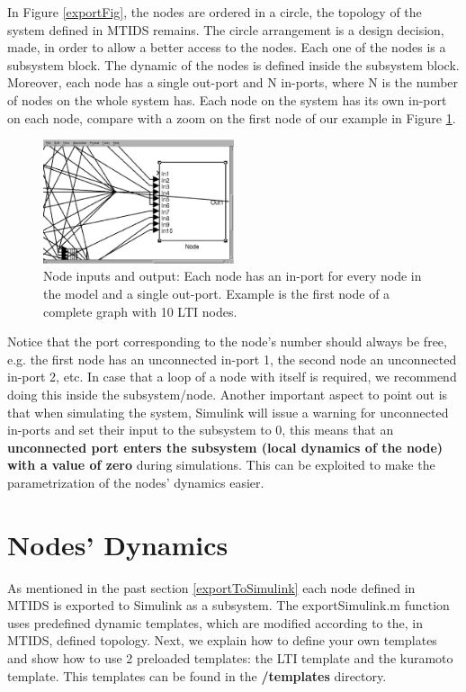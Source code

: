 \documentclass[a4paper,twoside, openright,12pt]{report}
\begin{document}
In Figure \ref{exportFig}, the nodes are ordered in a circle, the topology of the system defined in MTIDS remains. The circle arrangement is a 
design decision, made, in order to allow a better access to the nodes. Each one of the nodes is a subsystem block. The dynamic of the nodes is defined inside
the subsystem block. Moreover, each node has a single out-port and N in-ports, where N is the number of nodes on the whole system has. Each node on the 
system has its own in-port on each node, compare with a zoom on the first node of our example in Figure \ref{nodeFig}. \\
 
\begin{figure}[htb]
\centering
\includegraphics[width=0.5\textwidth]{pics/screenNode.eps}
\caption[MTIDS node in Simulink]{Node inputs and output: Each node has an in-port for every node in the model and a single out-port. Example is the first node of a complete graph with 10 LTI nodes. }
\label{nodeFig}
\end{figure}
Notice that the port corresponding to the node's number
should always be free, e.g. the first node has an unconnected in-port 1, the second node an unconnected in-port 2, etc. 
In case that a loop of a node with itself is required, we recommend doing this inside the subsystem/node. 
Another important aspect to point out is that when simulating the system, Simulink will issue a warning for unconnected in-ports and set their input to the subsystem to 0, this means 
that an \textbf{unconnected port enters the subsystem (local dynamics of the node) with a value of zero} during simulations. This can be exploited to 
make the parametrization of the nodes' dynamics easier. 

\section{Nodes' Dynamics}

As mentioned in the past section \ref{exportToSimulink} each node defined in MTIDS is exported to Simulink as a subsystem. The exportSimulink.m function 
uses predefined dynamic templates, which are modified according to the, in MTIDS, defined topology. Next, we explain how to define your own templates and
show how to use 2 preloaded templates: the LTI template and the kuramoto template. This templates can be found in the \textbf{/templates} directory. 
\end{document}
